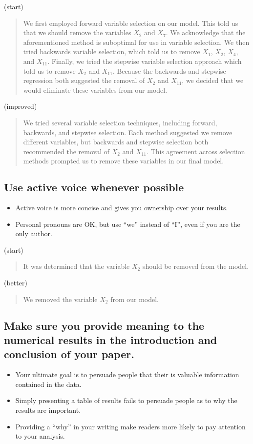 \documentclass[12pt]{notes}
\begin{document}
(start)
\begin{quote}
We first employed forward variable selection on our model. This told us that we should remove the variables $X_2$ and $X_7$. We acknowledge that the aforementioned method is suboptimal for use in variable selection. We then tried backwards variable selection, which told us to remove $X_1$, $X_2$, $X_4$, and $X_{11}.$ Finally, we tried the stepwise variable selection approach which told us to remove $X_2$ and $X_{11}$. Because the backwards and stepwise regression both suggested the removal of $X_2$ and $X_{11}$, we decided that we would eliminate these variables from our model. 
\end{quote}

(improved)
\begin{quote}
We tried several variable selection techniques, including forward, backwards, and stepwise selection. Each method suggested we remove different variables, but backwards and stepwise selection both recommended the removal of $X_2$ and $X_{11}$. This agreement across selection methods prompted us to remove these variables in our final model. 
\end{quote}

\subsection*{Use active voice whenever possible}
\begin{itemize}
\item Active voice is more concise and gives you ownership over your results. 
\item Personal pronouns are OK, but use ``we'' instead of ``I'', even if you are the only author. 
\end{itemize}

(start)
\begin{quote}
It was determined that the variable $X_2$ should be removed from the model. 
\end{quote}

(better)
\begin{quote}
We removed the variable $X_2$ from our model. 
\end{quote}

\subsection*{Make sure you provide meaning to the numerical results in the introduction and conclusion of your paper.}
\begin{itemize}
\item Your ultimate goal is to persuade people that their is valuable information contained in the data. 
\item Simply presenting a table of results fails to persuade people as to why the results are important. 
\item Providing a ``why'' in your writing make readers more likely to pay attention to your analysis. 
\end{itemize}
\end{document}
